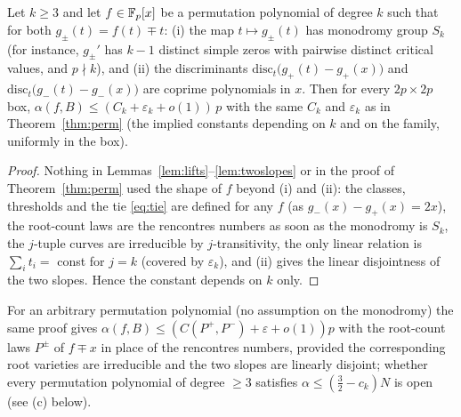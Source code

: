 \begin{corollary}\label{cor:permgen}
Let $k\ge3$ and let $f\in\mathbb{F}_p[x]$ be a permutation polynomial of degree $k$ such that for both $g_\pm(t)=f(t)\mp t$: (i) the map $t\mapsto g_\pm(t)$ has
monodromy group $S_k$ (for instance, $g_\pm'$ has $k-1$ distinct simple zeros with pairwise distinct critical values, and $p\nmid k$), and (ii) the
discriminants $\mathrm{disc}_t\bigl(g_+(t)-g_+(x)\bigr)$ and $\mathrm{disc}_t\bigl(g_-(t)-g_-(x)\bigr)$ are coprime polynomials in $x$.  Then for every
$2p\times2p$ box, $\alpha(f,B)\le(C_k+\varepsilon_k+o(1))\,p$ with the same $C_k$ and $\varepsilon_k$ as in Theorem~\ref{thm:perm} (the implied constants
depending on $k$ and on the family, uniformly in the box).
\end{corollary}
\begin{proof}
Nothing in Lemmas~\ref{lem:lifts}--\ref{lem:twoslopes} or in the proof of Theorem~\ref{thm:perm} used the shape of $f$ beyond (i) and (ii): the classes,
thresholds and the tie \eqref{eq:tie} are defined for any $f$ (as $g_-(x)-g_+(x)=2x$), the root-count laws are the rencontres numbers as soon as the
monodromy is $S_k$, the $j$-tuple curves are irreducible by $j$-transitivity, the only linear relation is $\sum_it_i=$ const for $j=k$ (covered by
$\varepsilon_k$), and (ii) gives the linear disjointness of the two slopes.  Hence the constant depends on $k$ only.
\end{proof}
For an arbitrary permutation polynomial (no assumption on the monodromy) the same proof gives $\alpha(f,B)\le(C(P^+,P^-)+\varepsilon+o(1))p$ with the
root-count laws $P^\pm$ of $f\mp x$ in place of the rencontres numbers, provided the corresponding root varieties are irreducible and the two slopes are
linearly disjoint; whether every permutation polynomial of degree $\ge3$ satisfies $\alpha\le(\tfrac32-c_k)N$ is open (see (c) below).

